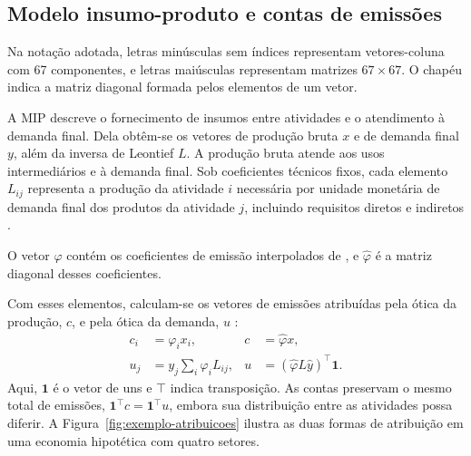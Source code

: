 \subsection{Modelo insumo-produto e contas de emissões}
\label{sec:derivacao}
\label{sec:atribuicoes}

Na notação adotada, letras minúsculas sem índices representam vetores-coluna com 67 componentes, e letras maiúsculas representam matrizes $67\times67$. O chapéu indica a matriz diagonal formada pelos elementos de um vetor.

A MIP descreve o fornecimento de insumos entre atividades e o atendimento à demanda final. Dela obtêm-se os vetores de produção bruta $x$ e de demanda final $y$, além da inversa de Leontief $L$. A produção bruta atende aos usos intermediários e à demanda final. Sob coeficientes técnicos fixos, cada elemento $L_{ij}$ representa a produção da atividade $i$ necessária por unidade monetária de demanda final dos produtos da atividade $j$, incluindo requisitos diretos e indiretos \parencite{millerBlair2009}.

O vetor $\varphi$ contém os coeficientes de emissão interpolados de \textcite{sanguinetAzzoni2024}, e $\widehat{\varphi}$ é a matriz diagonal desses coeficientes.

Com esses elementos, calculam-se os vetores de emissões atribuídas pela ótica da produção, $c$, e pela ótica da demanda, $u$ \parencite{marques2012}:
\begin{align}
c_i&=\varphi_i x_i, & c&=\widehat{\varphi}x,
\label{eq:conta-producao}
\\
u_j&=y_j\sum_i\varphi_iL_{ij}, & u&=(\widehat{\varphi}L\widehat y)^\top\mathbf{1}.
\label{eq:conta-demanda}
\end{align}
Aqui, $\mathbf{1}$ é o vetor de uns e $\top$ indica transposição. As contas preservam o mesmo total de emissões, $\mathbf{1}^\top c=\mathbf{1}^\top u$, embora sua distribuição entre as atividades possa diferir. A Figura~\ref{fig:exemplo-atribuicoes} ilustra as duas formas de atribuição em uma economia hipotética com quatro setores.

